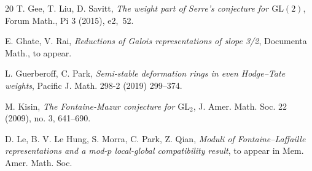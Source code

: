 \documentclass[11pt]{amsart}
\theoremstyle{definition}
\numberwithin{equation}{subsection}
\theoremstyle{plain}
\theoremstyle{plain}
\theoremstyle{plain}
\theoremstyle{plain}
\theoremstyle{plain}
\theoremstyle{plain}
\theoremstyle{plain}
\theoremstyle{plain}
\theoremstyle{plain}
\theoremstyle{plain}
\theoremstyle{plain}
\theoremstyle{plain}
\theoremstyle{definition}
\theoremstyle{definition}
\theoremstyle{definition}
\theoremstyle{remark}
\renewcommand{\(}{\textup{(}}
\renewcommand{\)}{\textup{)}}
\newcommand{\Q}{\mathbf{Q}}
\newcommand{\GL}{\mathrm{GL}}
\begin{document}
\begin{thebibliography}{20}
 T. Gee, T. Liu, D. Savitt, \emph{The weight part of Serre's conjecture for $\GL(2)$}, Forum Math., Pi 3 (2015), e2,~52.

 E. Ghate, V. Rai, \emph{Reductions of Galois representations of slope 3/2}, Documenta Math., to appear.


 L. Guerberoff, C. Park, \emph{Semi-stable deformation rings in even Hodge--Tate weights}, Pacific J. Math. 298-2 (2019) 299--374.








 M. Kisin, \emph{The Fontaine-Mazur conjecture for $\GL_2$}, J. Amer. Math. Soc. 22 (2009), no. 3, 641–690.





 D. Le, B. V. Le Hung, S. Morra, C. Park, Z. Qian, \emph{Moduli of Fontaine--Laffaille representations and a mod-$p$ local-global compatibility result}, to appear in Mem. Amer. Math. Soc.


\end{thebibliography}
\end{document}
